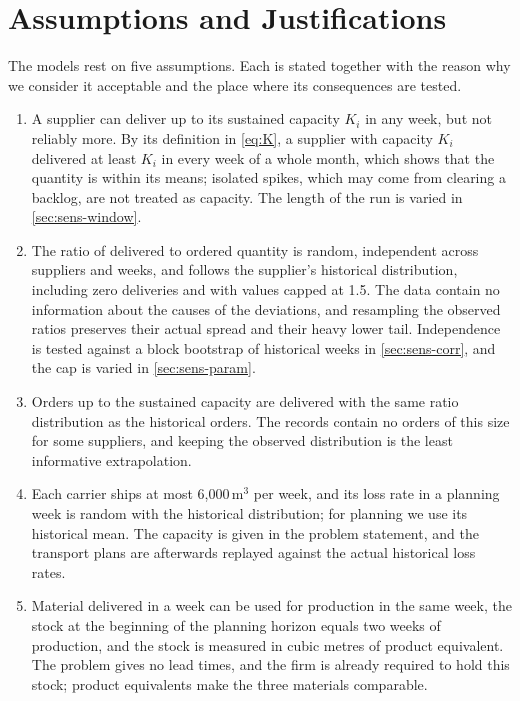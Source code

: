 \documentclass[11pt,a4paper]{article}
\begin{document}
\section{Assumptions and Justifications}\label{sec:assumptions}

The models rest on five assumptions.
Each is stated together with the reason why we consider it acceptable and the place where its consequences are tested.
\begin{enumerate}[label=A\arabic*.,leftmargin=*,itemsep=4pt]
\item A supplier can deliver up to its sustained capacity $K_i$ in any week, but not reliably more. By its definition in \cref{eq:K}, a supplier with capacity $K_i$ delivered at least $K_i$ in every week of a whole month, which shows that the quantity is within its means; isolated spikes, which may come from clearing a backlog, are not treated as capacity. The length of the run is varied in \cref{sec:sens-window}.
\item The ratio of delivered to ordered quantity is random, independent across suppliers and weeks, and follows the supplier's historical distribution, including zero deliveries and with values capped at 1.5. The data contain no information about the causes of the deviations, and resampling the observed ratios preserves their actual spread and their heavy lower tail. Independence is tested against a block bootstrap of historical weeks in \cref{sec:sens-corr}, and the cap is varied in \cref{sec:sens-param}.
\item Orders up to the sustained capacity are delivered with the same ratio distribution as the historical orders. The records contain no orders of this size for some suppliers, and keeping the observed distribution is the least informative extrapolation.
\item Each carrier ships at most 6{,}000\,m$^3$ per week, and its loss rate in a planning week is random with the historical distribution; for planning we use its historical mean. The capacity is given in the problem statement, and the transport plans are afterwards replayed against the actual historical loss rates.
\item Material delivered in a week can be used for production in the same week, the stock at the beginning of the planning horizon equals two weeks of production, and the stock is measured in cubic metres of product equivalent. The problem gives no lead times, and the firm is already required to hold this stock; product equivalents make the three materials comparable.
\end{enumerate}
\end{document}
